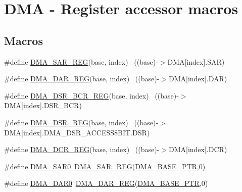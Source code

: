 \hypertarget{group___d_m_a___register___accessor___macros}{}\section{D\+MA -\/ Register accessor macros}
\label{group___d_m_a___register___accessor___macros}
\subsection*{Macros}
\begin{DoxyCompactItemize}
\item 
\#define \hyperlink{group___d_m_a___register___accessor___macros_ga9b1cd25baf4f888caa6e4f96c238bbeb}{D\+M\+A\+\_\+\+S\+A\+R\+\_\+\+R\+EG}(base,  index)                                ~((base)-\/$>$D\+MA\mbox{[}index\mbox{]}.S\+AR)
\item 
\#define \hyperlink{group___d_m_a___register___accessor___macros_gaff00a31c917565930c57e5ecd9fdfd8e}{D\+M\+A\+\_\+\+D\+A\+R\+\_\+\+R\+EG}(base,  index)                                ~((base)-\/$>$D\+MA\mbox{[}index\mbox{]}.D\+AR)
\item 
\#define \hyperlink{group___d_m_a___register___accessor___macros_ga6de33913b70e7b2aba1c7486827daf2a}{D\+M\+A\+\_\+\+D\+S\+R\+\_\+\+B\+C\+R\+\_\+\+R\+EG}(base,  index)                        ~((base)-\/$>$D\+MA\mbox{[}index\mbox{]}.D\+S\+R\+\_\+\+B\+CR)
\item 
\#define \hyperlink{group___d_m_a___register___accessor___macros_ga1e8cedd9bdbe33d859c60b86b0a6b3b1}{D\+M\+A\+\_\+\+D\+S\+R\+\_\+\+R\+EG}(base,  index)                                ~((base)-\/$>$D\+MA\mbox{[}index\mbox{]}.D\+M\+A\+\_\+\+D\+S\+R\+\_\+\+A\+C\+C\+E\+S\+S8\+B\+I\+T.\+D\+SR)
\item 
\#define \hyperlink{group___d_m_a___register___accessor___macros_ga1e1ba3e89c784e36af7e50ef3f415a2d}{D\+M\+A\+\_\+\+D\+C\+R\+\_\+\+R\+EG}(base,  index)                                ~((base)-\/$>$D\+MA\mbox{[}index\mbox{]}.D\+CR)
\item 
\#define \hyperlink{group___d_m_a___register___accessor___macros_ga6f8523733d96c977bb1be7b229f6f31e}{D\+M\+A\+\_\+\+S\+A\+R0}~\hyperlink{group___d_m_a___register___accessor___macros_ga9b1cd25baf4f888caa6e4f96c238bbeb}{D\+M\+A\+\_\+\+S\+A\+R\+\_\+\+R\+EG}(\hyperlink{group___d_m_a___peripheral_ga6997fbc1b1973e9f27170217a3bd6f22}{D\+M\+A\+\_\+\+B\+A\+S\+E\+\_\+\+P\+TR},0)
\item 
\#define \hyperlink{group___d_m_a___register___accessor___macros_gaead570256012035a8f2d34f11f29f715}{D\+M\+A\+\_\+\+D\+A\+R0}~\hyperlink{group___d_m_a___register___accessor___macros_gaff00a31c917565930c57e5ecd9fdfd8e}{D\+M\+A\+\_\+\+D\+A\+R\+\_\+\+R\+EG}(\hyperlink{group___d_m_a___peripheral_ga6997fbc1b1973e9f27170217a3bd6f22}{D\+M\+A\+\_\+\+B\+A\+S\+E\+\_\+\+P\+TR},0)

\end{DoxyCompactItemize}
